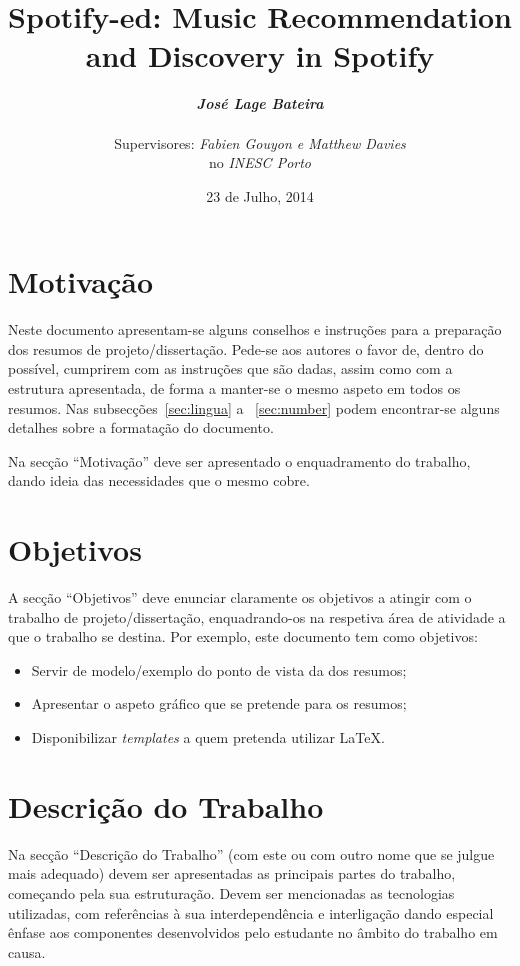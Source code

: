 \documentclass[twocolumn]{article}
\title{
  \huge
  \textbf{
    Spotify-ed: Music Recommendation and Discovery in Spotify
  }
}
\author{
  \large{\emph{\textbf{José Lage Bateira}}} \\ \\
  Supervisores: \emph{Fabien Gouyon e Matthew Davies}  \\
  no \emph{INESC Porto}
}
\date{23 de Julho, 2014}
\begin{document}
\maketitle

\thispagestyle{empty}

\section{Motivação}\label{sec:motiva}

Neste documento apresentam-se alguns conselhos e instruções para a preparação dos resumos de projeto/dissertação. 
Pede-se aos autores o favor de, dentro do possível, cumprirem com as instruções que são dadas, assim como com a estrutura apresentada, de forma a manter-se o mesmo aspeto em todos os resumos. 
Nas subsecções~\ref{sec:lingua} a ~\ref{sec:number} podem encontrar-se alguns detalhes sobre a formatação do documento. 

Na secção ``Motivação'' deve ser apresentado o enquadramento do trabalho, dando ideia das necessidades que o mesmo cobre.

\section{Objetivos}\label{sec:goals}

A secção ``Objetivos'' deve enunciar claramente os objetivos a atingir com o trabalho de projeto/dissertação, enquadrando-os na respetiva área de atividade a que o trabalho se destina. 
Por exemplo, este documento tem como objetivos:
\begin{itemize}
\item Servir de modelo/exemplo do ponto de vista da dos resumos;
\item Apresentar o aspeto gráfico que se pretende para os resumos;
\item Disponibilizar \emph{templates} a quem pretenda utilizar \LaTeX.
\end{itemize}

\section{Descrição do Trabalho}\label{sec:work}

Na secção ``Descrição do Trabalho'' (com este ou com outro nome que se julgue mais adequado) devem ser apresentadas as principais partes do trabalho, começando pela sua estruturação. Devem ser mencionadas as tecnologias utilizadas, com referências à sua interdependência e interligação dando especial ênfase aos componentes desenvolvidos pelo estudante no âmbito do trabalho em causa.
\end{document}
